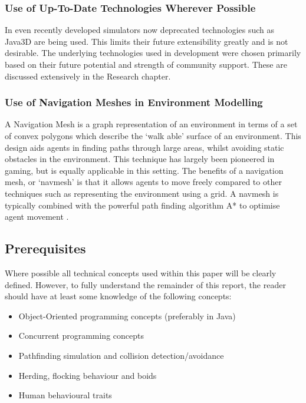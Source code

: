 \subsubsection{Use of Up-To-Date Technologies Wherever Possible}
In even recently developed simulators now deprecated technologies such as Java3D are being used. This limits their future extensibility greatly and is not desirable.
The underlying technologies used in development were chosen primarily based on their future potential and strength of community support.
These are discussed extensively in the Research chapter.

\subsubsection{Use of Navigation Meshes in Environment Modelling}
A Navigation Mesh is a graph representation of an environment in terms of a set of convex polygons which describe the `walk able' surface of an environment. This design aids agents in finding paths through large areas, whilst avoiding static obstacles in the environment.
This technique has largely been pioneered in gaming, but is equally applicable in this setting. The benefits of a navigation mesh, or `navmesh' is that it allows agents to move 
freely compared to other techniques such as representing the environment using a grid. A navmesh is typically combined with the powerful path finding algorithm A* to 
optimise agent movement \cite{A*Review}.

\subsection{Prerequisites}
Where possible all technical concepts used within this paper will be clearly defined. However, to fully understand the remainder of this report, the reader should have at least
some knowledge of the following concepts:
\begin{itemize}
 \item Object-Oriented programming concepts (preferably in Java)
 \item Concurrent programming concepts
 \item Pathfinding simulation and collision detection/avoidance~\cite{gameProgramming}~\cite{collisionDetection}
 \item Herding, flocking behaviour and boids~\cite{HAndBoid}~\cite{Fbehavior}
 \item Human behavioural traits~\cite{HumanBehaviouralTraits}
\end{itemize}

